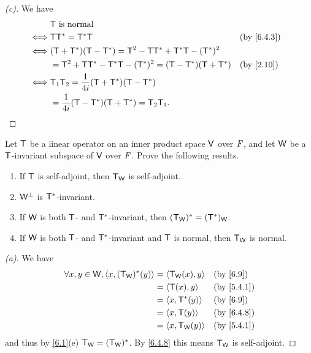 \begin{proof}[(c)]
  We have
  \begin{align*}
         & \T \text{ is normal}                                                            \\
    \iff & \T \T^* = \T^* \T                                               &  & \by{6.4.3} \\
    \iff & (\T + \T^*) (\T - \T^*) = \T^2 - \T \T^* + \T^* \T - (\T^*)^2                   \\
         & = \T^2 + \T \T^* - \T^* \T - (\T^*)^2 = (\T - \T^*) (\T + \T^*) &  & \by{2.10}  \\
    \iff & \T_1 \T_2 = \dfrac{1}{4i} (\T + \T^*) (\T - \T^*)                               \\
         & = \dfrac{1}{4i} (\T - \T^*) (\T + \T^*) = \T_2 \T_1.
  \end{align*}
\end{proof}

\begin{ex}\label{ex:6.4.7}
  Let \(\mathsf{T}\) be a linear operator on an inner product space \(\mathsf{V}\) over \(\mathit{F}\), and let \(\mathsf{W}\) be a \(\mathsf{T}\)-invariant subspace of \(\mathsf{V}\) over \(\mathit{F}\).
  Prove the following results.
  \begin{enumerate}
    \item If \(\mathsf{T}\) is self-adjoint, then \(\mathsf{T}_{\mathsf{W}}\) is self-adjoint.
    \item \(\mathsf{W}^{\perp}\) is \(\mathsf{T}^*\)-invariant.
    \item If \(\mathsf{W}\) is both \(\mathsf{T}\)- and \(\mathsf{T}^*\)-invariant, then \((\mathsf{T}_{\mathsf{W}})^* = (\mathsf{T}^*)_{\mathsf{W}}\).
    \item If \(\mathsf{W}\) is both \(\mathsf{T}\)- and \(\mathsf{T}^*\)-invariant and \(\mathsf{T}\) is normal, then \(\mathsf{T}_{\mathsf{W}}\) is normal.
  \end{enumerate}
\end{ex}

\begin{proof}[(a)]
  We have
  \begin{align*}
    \forall x, y \in \W, \inn{x, (\T_{\W})^*(y)} & = \inn{\T_{\W}(x), y} &  & \by{6.9}   \\
                                                 & = \inn{\T(x), y}      &  & \by{5.4.1} \\
                                                 & = \inn{x, \T^*(y)}    &  & \by{6.9}   \\
                                                 & = \inn{x, \T(y)}      &  & \by{6.4.8} \\
                                                 & = \inn{x, \T_{\W}(y)} &  & \by{5.4.1}
  \end{align*}
  and thus by \cref{6.1}(e) \(\mathsf{T}_{\mathsf{W}} = (\mathsf{T}_{\mathsf{W}})^*\).
  By \cref{6.4.8} this means \(\mathsf{T}_{\mathsf{W}}\) is self-adjoint.
\end{proof}

